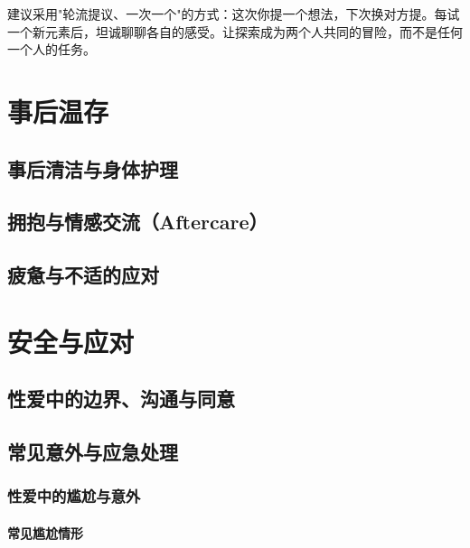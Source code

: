 \documentclass[12pt,UTF8]{ctexbook}
\begin{document}
\begin{tcolorbox}[colback=pink!5!white,colframe=red!50!black,title=贴心小叮咛]
建议采用"轮流提议、一次一个"的方式：这次你提一个想法，下次换对方提。每试一个新元素后，坦诚聊聊各自的感受。让探索成为两个人共同的冒险，而不是任何一个人的任务。
\end{tcolorbox}

\part{事后温存}

\chapter{事后清洁与身体护理}
\chapter{拥抱与情感交流（Aftercare）}
\chapter{疲惫与不适的应对}

\part{安全与应对}

\chapter{性爱中的边界、沟通与同意}

\chapter{常见意外与应急处理}


\section{性爱中的尴尬与意外}
\subsection{常见尴尬情形}
\end{document}
